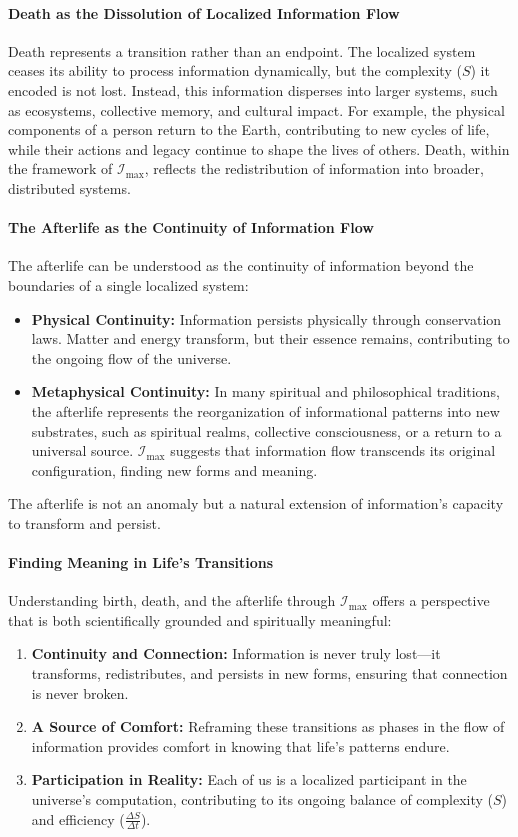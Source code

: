 \documentclass[12pt]{article}
\begin{document}
\paragraph{Death as the Dissolution of Localized Information Flow}
Death represents a transition rather than an endpoint. The localized system ceases its ability to process information dynamically, but the complexity (\(S\)) it encoded is not lost. Instead, this information disperses into larger systems, such as ecosystems, collective memory, and cultural impact. For example, the physical components of a person return to the Earth, contributing to new cycles of life, while their actions and legacy continue to shape the lives of others. Death, within the framework of \(\mathcal{I}_{\text{max}}\), reflects the redistribution of information into broader, distributed systems.

\paragraph{The Afterlife as the Continuity of Information Flow}
The afterlife can be understood as the continuity of information beyond the boundaries of a single localized system:
\begin{itemize}
    \item \textbf{Physical Continuity:} Information persists physically through conservation laws. Matter and energy transform, but their essence remains, contributing to the ongoing flow of the universe.
    \item \textbf{Metaphysical Continuity:} In many spiritual and philosophical traditions, the afterlife represents the reorganization of informational patterns into new substrates, such as spiritual realms, collective consciousness, or a return to a universal source. \(\mathcal{I}_{\text{max}}\) suggests that information flow transcends its original configuration, finding new forms and meaning.
\end{itemize}
The afterlife is not an anomaly but a natural extension of information’s capacity to transform and persist.

\paragraph{Finding Meaning in Life’s Transitions}
Understanding birth, death, and the afterlife through \(\mathcal{I}_{\text{max}}\) offers a perspective that is both scientifically grounded and spiritually meaningful:
\begin{enumerate}
    \item \textbf{Continuity and Connection:} Information is never truly lost—it transforms, redistributes, and persists in new forms, ensuring that connection is never broken.
    \item \textbf{A Source of Comfort:} Reframing these transitions as phases in the flow of information provides comfort in knowing that life’s patterns endure.
    \item \textbf{Participation in Reality:} Each of us is a localized participant in the universe’s computation, contributing to its ongoing balance of complexity (\(S\)) and efficiency (\(\frac{\Delta S}{\Delta t}\)).
\end{enumerate}
\end{document}
